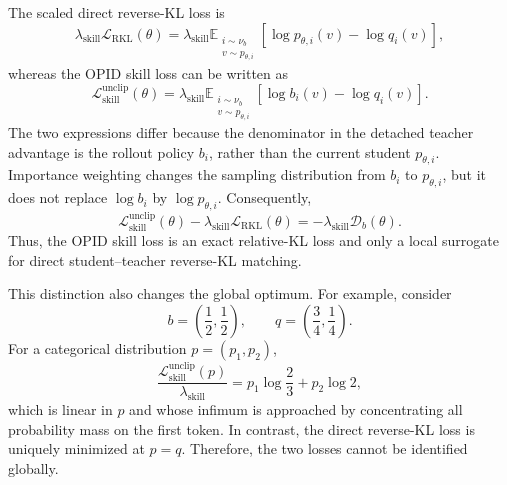 \documentclass{llmxive}
\begin{document}
\begin{remark}
\label{rem:not_direct_kl}
The scaled direct reverse-KL loss is
\begin{equation*}
 \lambda_{\mathrm{skill}}
 \mathcal L_{\mathrm{RKL}}(\theta)
 =
 \lambda_{\mathrm{skill}}
 \mathbb E_{\substack{i\sim\nu_b\\v\sim p_{\theta,i}}}
 \left[
   \log p_{\theta,i}(v)-\log q_i(v)
 \right],
\end{equation*}
whereas the OPID skill loss can be written as
\begin{equation*}
 \mathcal L_{\mathrm{skill}}^{\mathrm{unclip}}(\theta)
 =
 \lambda_{\mathrm{skill}}
 \mathbb E_{\substack{i\sim\nu_b\\v\sim p_{\theta,i}}}
 \left[
   \log b_i(v)-\log q_i(v)
 \right].
\end{equation*}
The two expressions differ because the denominator in the detached
teacher advantage is the rollout policy \(b_i\), rather than the current
student \(p_{\theta,i}\). Importance weighting changes the sampling
distribution from \(b_i\) to \(p_{\theta,i}\), but it does not replace
\(\log b_i\) by \(\log p_{\theta,i}\). Consequently,
\begin{equation*}
 \mathcal L_{\mathrm{skill}}^{\mathrm{unclip}}(\theta)
 -
 \lambda_{\mathrm{skill}}
 \mathcal L_{\mathrm{RKL}}(\theta)
 =
 -
 \lambda_{\mathrm{skill}}\mathcal D_b(\theta).
\end{equation*}
Thus, the OPID skill loss is an exact relative-KL loss and only a local
surrogate for direct student--teacher reverse-KL matching.

This distinction also changes the global optimum. For example, consider
\[
 b=\left(\frac12,\frac12\right),
 \qquad
 q=\left(\frac34,\frac14\right).
\]
For a categorical distribution \(p=(p_1,p_2)\),
\begin{equation*}
 \frac{
 \mathcal L_{\mathrm{skill}}^{\mathrm{unclip}}(p)
 }{
 \lambda_{\mathrm{skill}}
 }
 =
 p_1\log\frac{2}{3}
 +
 p_2\log 2,
\end{equation*}
which is linear in \(p\) and whose infimum is approached by concentrating
all probability mass on the first token. In contrast, the direct reverse-KL
loss is uniquely minimized at \(p=q\). Therefore, the two losses cannot be
identified globally.
\end{remark}
\end{document}
